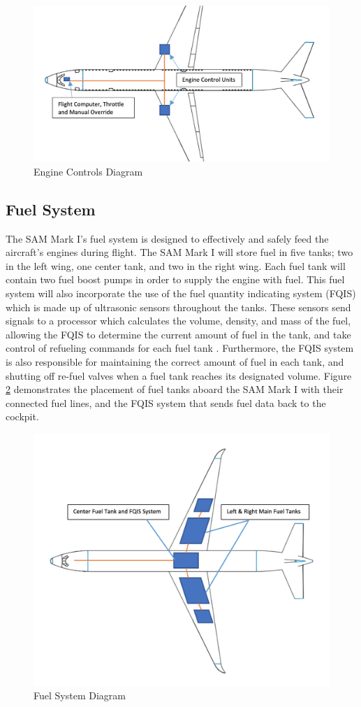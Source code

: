 \begin{figure}[H]
    \centering
    \includegraphics[width=.85\linewidth]{Photos/systems/engine_controls.png}
    \caption{Engine Controls Diagram}
    \label{engine_controls}
\end{figure}

\subsection{Fuel System}
The SAM Mark I’s fuel system is designed to effectively and safely feed the aircraft’s engines during flight. The SAM Mark I will store fuel in five tanks; two in the left wing, one center tank, and two in the right wing. Each fuel tank will contain two fuel boost pumps in order to supply the engine with fuel. This fuel system will also incorporate the use of the fuel quantity indicating system (FQIS) which is made up of ultrasonic sensors throughout the tanks. These sensors send signals to a processor which calculates the volume, density, and mass of the fuel, allowing the FQIS to determine the current amount of fuel in the tank, and take control of refueling commands for each fuel tank \cite{fuel_system}. Furthermore, the FQIS system is also responsible for maintaining the correct amount of fuel in each tank, and shutting off re-fuel valves when a fuel tank reaches its designated volume. Figure \ref{fuel_tank} demonstrates the placement of fuel tanks aboard the SAM Mark I with their connected fuel lines, and the FQIS system that sends fuel data back to the cockpit.

\begin{figure}[H]
    \centering
    \includegraphics[width=.85\linewidth]{Photos/Fuel_tanks.png}
    \caption{Fuel System Diagram}
    \label{fuel_tank}
\end{figure}
 
